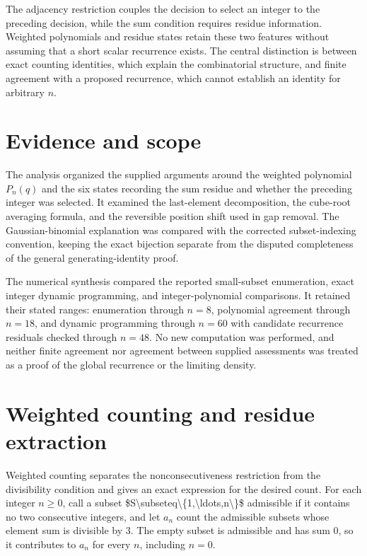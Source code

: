 \documentclass[11pt]{article}
\begin{document}
The adjacency restriction couples the decision to select an integer to the preceding decision, while the sum condition requires residue information. Weighted polynomials and residue states retain these two features without assuming that a short scalar recurrence exists. The central distinction is between exact counting identities, which explain the combinatorial structure, and finite agreement with a proposed recurrence, which cannot establish an identity for arbitrary $n$.

\section{Evidence and scope}
The analysis organized the supplied arguments around the weighted polynomial $P_n(q)$ and the six states recording the sum residue and whether the preceding integer was selected. It examined the last-element decomposition, the cube-root averaging formula, and the reversible position shift used in gap removal. The Gaussian-binomial explanation was compared with the corrected subset-indexing convention, keeping the exact bijection separate from the disputed completeness of the general generating-identity proof.

The numerical synthesis compared the reported small-subset enumeration, exact integer dynamic programming, and integer-polynomial comparisons. It retained their stated ranges: enumeration through $n=8$, polynomial agreement through $n=18$, and dynamic programming through $n=60$ with candidate recurrence residuals checked through $n=48$. No new computation was performed, and neither finite agreement nor agreement between supplied assessments was treated as a proof of the global recurrence or the limiting density.

\section{Weighted counting and residue extraction}
Weighted counting separates the nonconsecutiveness restriction from the divisibility condition and gives an exact expression for the desired count. For each integer $n\geq 0$, call a subset \$S\textbackslash{}subseteq\textbackslash{}\{1,\textbackslash{}ldots,n\textbackslash{}\}\$ admissible if it contains no two consecutive integers, and let $a_n$ count the admissible subsets whose element sum is divisible by $3$. The empty subset is admissible and has sum $0$, so it contributes to $a_n$ for every $n$, including $n=0$.
\end{document}
